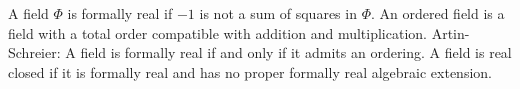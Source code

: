 A field $\Phi$ is formally real if $-1$ is not a sum of squares in $\Phi$. An ordered field is a field with a total order compatible with addition and multiplication. Artin-Schreier: A field is formally real if and only if it admits an ordering. A field is real closed if it is formally real and has no proper formally real algebraic extension.
